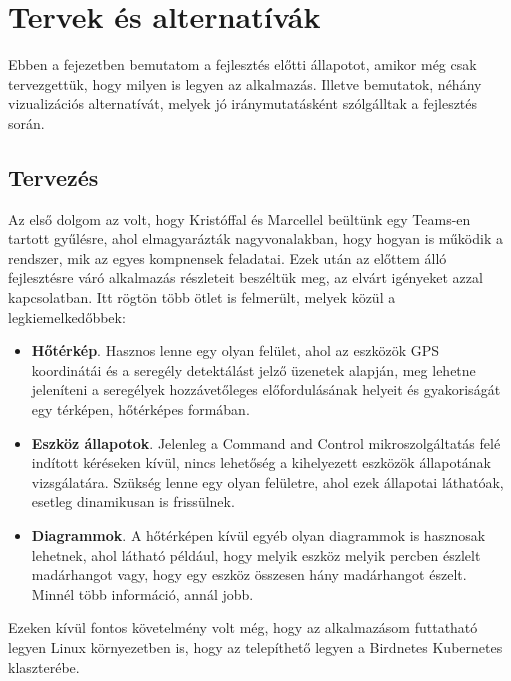 \chapter{Tervek és alternatívák}
\label{chapt:birdmap-introduction}
Ebben a fejezetben bemutatom a fejlesztés előtti állapotot, amikor még csak tervezgettük, hogy milyen is legyen az alkalmazás.
Illetve bemutatok, néhány vizualizációs alternatívát, melyek jó iránymutatásként szólgálltak a fejlesztés során.

\section{Tervezés}
Az első dolgom az volt, hogy Kristóffal és Marcellel beültünk egy Teams\footnotemark-en tartott gyűlésre,
ahol elmagyarázták nagyvonalakban, hogy hogyan is működik a rendszer, mik az egyes kompnensek feladatai. 
Ezek után az előttem álló fejlesztésre váró alkalmazás részleteit beszéltük meg, az elvárt igényeket azzal kapcsolatban.
Itt rögtön több ötlet is felmerült, melyek közül a legkiemelkedőbbek:
\begin{itemize}
    \item \textbf{Hőtérkép}. Hasznos lenne egy olyan felület, ahol az eszközök GPS koordinátái és a seregély detektálást jelző üzenetek alapján, meg lehetne jeleníteni a seregélyek hozzávetőleges előfordulásának helyeit és gyakoriságát egy térképen, hőtérképes formában.
    \item \textbf{Eszköz állapotok}. Jelenleg a Command and Control mikroszolgáltatás felé indított kéréseken kívül, nincs lehetőség a kihelyezett eszközök állapotának vizsgálatára. Szükség lenne egy olyan felületre, ahol ezek állapotai láthatóak, esetleg dinamikusan is frissülnek.
    \item \textbf{Diagrammok}. A hőtérképen kívül egyéb olyan diagrammok is hasznosak lehetnek, ahol látható például, hogy melyik eszköz melyik percben észlelt madárhangot vagy, hogy egy eszköz összesen hány madárhangot észelt. Minnél több információ, annál jobb.
\end{itemize}
Ezeken kívül fontos követelmény volt még, hogy az alkalmazásom futtatható legyen Linux környezetben is, hogy az telepíthető legyen a Birdnetes Kubernetes\cite{kubernetes} klaszterébe.

